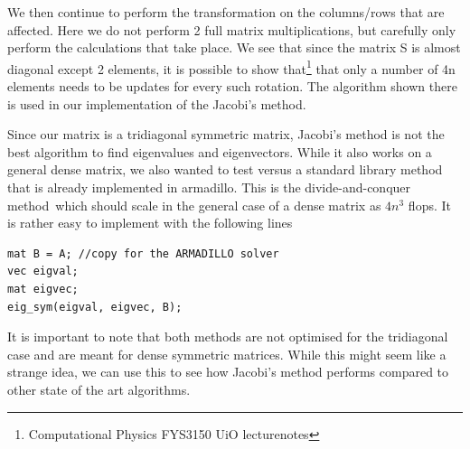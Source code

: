 \documentclass[a4paper,11pt]{article}
\begin{document}
{We then continue to perform the transformation on the columns/rows that are affected. Here we do not perform 2 full matrix multiplications, but carefully only perform the calculations that take place. We see that since the matrix S is almost diagonal except 2 elements, it is possible to show that\footnote{Computational Physics FYS3150 UiO lecturenotes} that only a number of 4n elements needs to be updates for every such rotation. The algorithm shown there is used in our implementation of the Jacobi's method. 

Since our matrix is a tridiagonal symmetric matrix, Jacobi's method is not the best algorithm to find eigenvalues and eigenvectors. While it also works on a general dense matrix, we also wanted to test versus a standard library method that is already implemented in armadillo. This is the divide-and-conquer method\ which should scale in the general case of a dense matrix as $4n^3$ flops\cite{Divide-and-conquer}. It is rather easy to implement with the following lines
\begin{lstlisting}
mat B = A; //copy for the ARMADILLO solver
vec eigval;
mat eigvec;
eig_sym(eigval, eigvec, B);
\end{lstlisting}
It is important to note that both methods are not optimised for the tridiagonal case and are meant for dense symmetric matrices. While this might seem like a strange idea, we can use this to see how Jacobi's method performs compared to other state of the art algorithms. 








}
\end{document}
